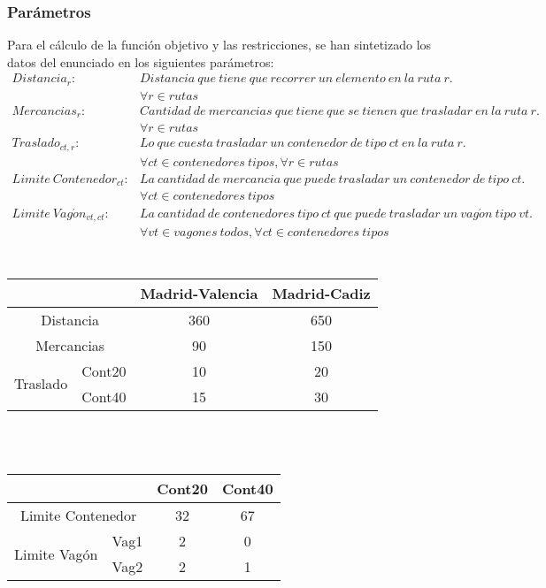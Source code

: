 \documentclass[11pt,spanish]{article}
\begin{document}
			\subsubsection{Parámetros}
			Para el cálculo de la función objetivo y las restricciones, se han sintetizado los datos del enunciado en los siguientes parámetros:
			\begin{align*}
				Distancia_r:& Distancia\ que\ tiene\ que\ recorrer\ un\ elemento\ en\ la\ ruta\ r.\\
				&\forall r \in rutas\\
				Mercancias_r:& Cantidad\ de\ mercancias\ que\ tiene\ que\ se\ tienen\ que\ trasladar\ en\ la\ ruta\ r.\\
				&\forall r \in rutas\\
				Traslado_{ct,r}:& Lo\ que\ cuesta\ trasladar\ un\ contenedor\ de\ tipo\ ct\ en\ la\ ruta\ r.\\
				&\forall ct \in contenedores\ tipos, \forall r \in rutas \\
				Limite\ Contenedor_{ct}:& La\ cantidad\ de\ mercancia\ que\ puede\ trasladar\ un\ contenedor\ de\ tipo\ ct.\\
				&\forall ct \in contenedores\ tipos\\
				Limite\ Vag\acute{o}n_{vt,ct}:& La\ cantidad\ de\ contenedores\ tipo\ ct\ que\ puede\ trasladar\ un\ vag\acute{o}n\ tipo\ vt.\\
				&\forall vt \in vagones\ todos, \forall ct \in contenedores\ tipos\\
			\end{align*}
			\\
			\label{tab:params2rut}
			\begin{tabular}{ |c|c||c|c|  }
				\hline
				\multicolumn{2}{|c||}{}& Madrid-Valencia & Madrid-Cadiz \\
				\hline
				\multicolumn{2}{|c||}{Distancia} & 360 & 650\\
				\multicolumn{2}{|c||}{Mercancias} & 90 & 150\\
				\multirow{2}{*}{Traslado} & Cont20 & 10 & 20\\
				& Cont40 & 15 & 30\\
				\hline
			\end{tabular}
			\\
			\\
			\label{tab:params2cont}
			\begin{tabular}{ |c|c||c|c|  }
				\hline
				\multicolumn{2}{|c||}{}& Cont20 & Cont40 \\
				\hline
				\multicolumn{2}{|c||}{Limite Contenedor} & 32 & 67\\
				\multirow{2}{*}{Limite Vagón} & Vag1 & 2 & 0\\
				& Vag2 & 2 & 1\\
				\hline
			\end{tabular}
\end{document}
